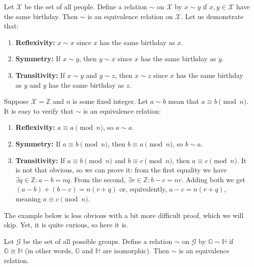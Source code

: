 \documentclass[../lecture-notes.tex]{subfiles}
\begin{document}
\begin{example}
    Let $\mathcal{X}$ be the set of all people. Define a relation $\sim$ on $\mathcal{X}$ by $x \sim y$ if $x,y \in \mathcal{X}$ have the same birthday. 
    Then $\sim$ is an equivalence relation on $\mathcal{X}$. Let us demonstrate that:
    \begin{enumerate}
        \item \textbf{Reflexivity:} $x \sim x$ since $x$ has the same birthday as $x$.
        \item \textbf{Symmetry:} If $x \sim y$, then $y \sim x$ since $x$ has the same birthday as $y$.
        \item \textbf{Transitivity:} If $x \sim y$ and $y \sim z$, then $x \sim z$ since $x$ has the same birthday as $y$ and $y$ has the same birthday as $z$.
    \end{enumerate}
\end{example}

\begin{example}
    Suppose $\mathcal{X} = \mathbb{Z}$ and $n$ is some fixed integer. Let $a \sim b$ mean that $a \equiv b \pmod{n}$. It is easy to verify that $\sim$ is an equivalence relation:
    \begin{enumerate}
        \item \textbf{Reflexivity:} $a \equiv a \pmod{n}$, so $a \sim a$.
        \item \textbf{Symmetry:} If $a \equiv b \pmod{n}$, then $b \equiv a \pmod{n}$, so $b \sim a$.
        \item \textbf{Transitivity:} If $a \equiv b \pmod{n}$ and $b \equiv c \pmod{n}$, then $a \equiv c \pmod{n}$. It is not that obvious, so we can prove it: from the first equality we have $\exists q \in \mathbb{Z}: a-b = nq$. From the second, $\exists r \in \mathbb{Z}: b-c = nr$. Adding both we get $(a-b)+(b-c) = n(r+q)$ or, equivalently, $a-c = n(r+q)$, meaning $a \equiv c \pmod{n}$.
    \end{enumerate}
\end{example}

The example below is less obvious with a bit more difficult proof, which we will skip. Yet, it is quite curious, so here it is.

\begin{example}
    Let $\mathcal{G}$ be the set of all possible groups. Define a relation $\sim$ on $\mathcal{G}$ by $\mathbb{G} \sim \mathbb{H}$ if $\mathbb{G} \cong \mathbb{H}$ (in other words, $\mathbb{G}$ and $\mathbb{H}$ are isomorphic). Then $\sim$ is an equivalence relation.
\end{example}
\end{document}

